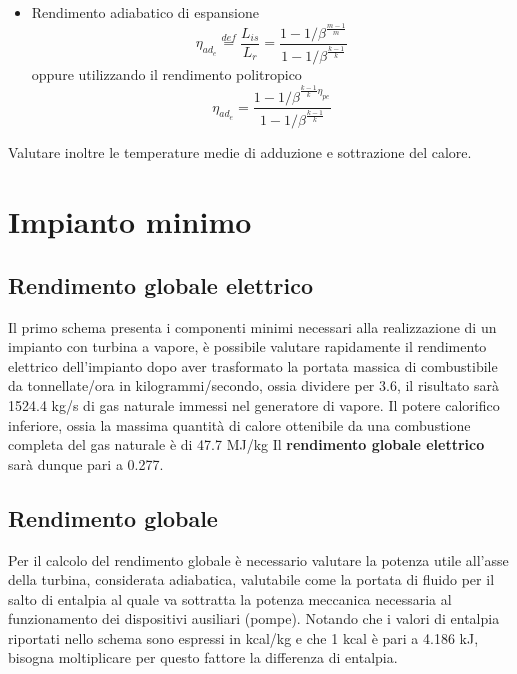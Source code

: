 \documentclass[a4paper,12pt]{article}
\begin{document}
\begin{itemize}
   \item Rendimento adiabatico di espansione
   \begin{equation}
        \label{eq:rendimento_adiabatico}
        \eta_{ad_e} \stackrel{def}{=} \frac{L_{is}}{L_r} = \frac{1-1/\beta^{\frac{m-1}{m}}}
        {1-1/\beta^{\frac{k-1}{k}}}
   \end{equation}
   oppure utilizzando il rendimento politropico
   \begin{equation}
        \label{eq:rendimento_adiabatico_con_rendimento_politropico}
        \eta_{ad_e} = \frac{1-1/\beta^{\frac{k-1}{k}\eta_{pe}}}
        {1-1/\beta^{\frac{k-1}{k}}}
   \end{equation}
\end{itemize}
Valutare inoltre le temperature medie di adduzione e sottrazione del calore.

\section{Impianto minimo}
\label{sec:primo_impianto}
\subsection{Rendimento globale elettrico}
\label{subsec:rendimento_globale_elettrico}
Il primo schema presenta i componenti minimi necessari alla realizzazione di un impianto con turbina a vapore,
è possibile valutare rapidamente il rendimento elettrico dell'impianto dopo aver trasformato la portata massica di combustibile da 
tonnellate/ora in kilogrammi/secondo, ossia dividere per 3.6, il risultato sarà 1524.4 kg/s di gas naturale immessi nel generatore di vapore.
Il potere calorifico inferiore, ossia la massima quantità di calore ottenibile da una combustione completa del gas naturale è di 47.7 MJ/kg
Il \textbf{rendimento globale elettrico} sarà dunque pari a 0.277.

\subsection{Rendimento globale}
\label{subsec:rendimento_globale}
Per il calcolo del rendimento globale è necessario valutare la potenza utile all'asse della turbina, considerata adiabatica,
valutabile come la portata di fluido per il salto di entalpia al quale va sottratta la potenza meccanica necessaria al funzionamento
dei dispositivi ausiliari (pompe).
Notando che i valori di entalpia riportati nello schema sono espressi in kcal/kg e che 1 kcal è pari a 4.186 kJ,
bisogna moltiplicare per questo fattore la differenza di entalpia.
\end{document}
